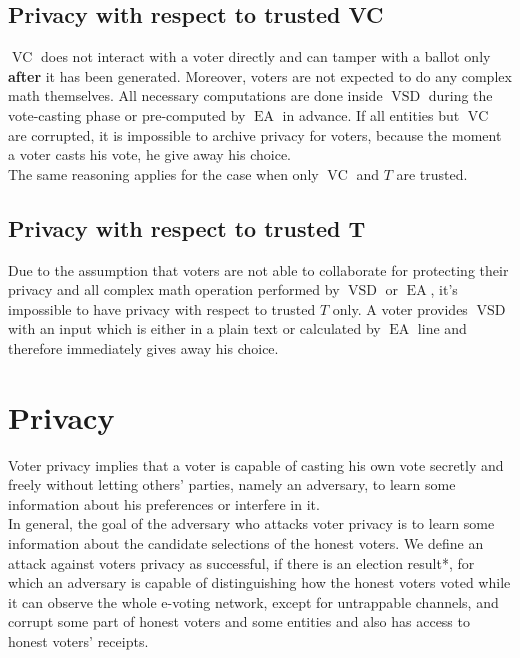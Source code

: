 \documentclass[12pt]{article}
\DeclareMathOperator{\vsd}{VSD}
\DeclareMathOperator{\ea}{EA}
\DeclareMathOperator{\voc}{VC}
\begin{document}
\subsection{Privacy with respect to trusted VC}
 $\voc$ does not interact with a voter directly and can tamper with a ballot only \textbf{after} it has been generated. Moreover, voters are not expected to do any complex math themselves. All necessary computations are done inside $\vsd$ during the vote-casting phase or pre-computed by $\ea$ in advance. If all entities but $\voc$ are corrupted, it is impossible to archive privacy for voters, because the moment a voter casts his vote, he give away his choice.\\
 
 The same reasoning applies for the case when only $\voc$ and $T$ are trusted. 
\subsection{Privacy with respect to trusted T}
Due to the assumption that voters are not able to collaborate for protecting their privacy and all complex math operation performed by $\vsd$ or $\ea$, it's impossible to have privacy with respect to trusted $T$ only. A voter provides $\vsd$ with an input which is either in a plain text or calculated by $\ea$ line and therefore immediately gives away his choice.
%

\section{Privacy}

Voter privacy implies that a voter is capable of casting his own vote secretly and freely without letting others' parties, namely an adversary, to learn some information about his preferences or interfere in it.\\

In general, the goal of the adversary who attacks voter privacy is to learn some information about the candidate selections of the honest voters. We define an attack against voters privacy as successful, if there is an election result*, for which an adversary is capable of distinguishing how the honest voters voted while it can observe the whole e-voting network, except for untrappable channels, and corrupt some part of honest voters and some entities and also has access to honest voters' receipts. \\
\end{document}
